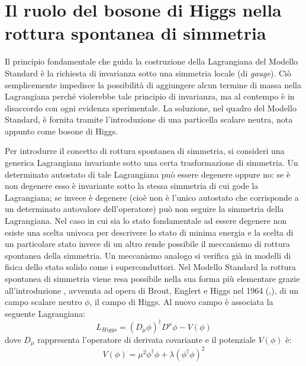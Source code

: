 \section{Il ruolo del bosone di Higgs nella rottura spontanea di simmetria}
Il principio fondamentale che guida la costruzione della Lagrangiana del Modello Standard è la richiesta di invarianza sotto una simmetria locale
(di \textit{gauge}).
Ciò semplicemente impedisce la possibilità di aggiungere alcun termine di massa nella Lagrangiana perché violerebbe tale principio di invarianza,
ma al contempo è in disaccordo con ogni evidenza sperimentale.
\newline
La soluzione, nel quadro del Modello Standard, è fornita tramite l'introduzione di una particella scalare neutra, nota appunto come bosone di Higgs.

\medskip
Per introdurre il concetto di rottura spontanea di simmetria, si consideri una generica Lagrangiana invariante sotto una certa trasformazione
di simmetria.
Un determinato autostato di tale Lagrangiana può essere degenere oppure no: se è non degenere esso è invariante sotto la stessa simmetria di
cui gode la Lagrangiana; se invece è degenere (cioè non è l'unico autostato che corrisponde a un determinato autovalore dell'operatore) può non
seguire la simmetria della Lagrangiana.
\newline
Nel caso in cui sia lo stato fondamentale ad essere degenere non esiste una scelta univoca per descrivere lo stato di minima energia e la scelta
di un particolare stato invece di un altro rende possibile il meccanismo di rottura spontanea della simmetria. 
Un meccanismo analogo si verifica già in modelli di fisica dello stato solido come i superconduttori.
\newline
Nel Modello Standard la rottura spontanea di simmetria viene resa possibile nella sua forma più elementare grazie all'introduzione
, avvenuta ad opera di Brout, Englert e Higgs nel 1964 (\cite{rottura},\cite{higgs2}), di un campo scalare neutro $\phi$, il campo di Higgs.
\newline
Al nuovo campo è associata la seguente Lagrangiana:
\begin{equation}
 L_{Higgs}=(D_{\mu}\phi)^{\dagger}D^{\mu}\phi -V(\phi)
\end{equation}
dove $D_{\mu}$ rappresenta l'operatore di derivata covariante e il potenziale $V(\phi)$ è:
\begin{equation}
 V(\phi)=\mu^{2}\phi^{\dagger}\phi+\lambda(\phi^{\dagger}\phi)^{2}
\end{equation}
